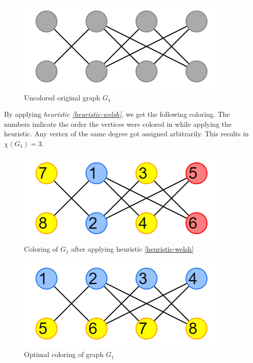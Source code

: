 \documentclass{article}
\newcounter{heuristic} \setcounter{heuristic}{0}
\theoremstyle{definition}
\begin{document}
\begin{figure}[H]
\centering
\includegraphics[scale=0.5]{images/graph-1.png}
\caption{Uncolored original graph \(G_1\)}
\end{figure}

By applying \emph{heuristic \ref{heuristic-welsh}}, we get the following coloring. The numbers indicate the order the vertices were colored in while applying the heuristic. Any vertex of the same degree got assigned arbitrarily. This results in \(\chi(G_1) = 3\).

\begin{multicols}{2}
  \begin{figure}[H]
  \centering
  \includegraphics[scale=0.5]{images/graph-2.png}
  \caption{Coloring of $G_1$ after applying heuristic \ref{heuristic-welsh}}
  \end{figure}

  \begin{figure}[H]
  \centering
  \includegraphics[scale=0.5]{images/graph-3.png}
  \caption{Optimal coloring of graph \(G_1\)}\label{fig:ex1-optimal}
  \end{figure}
\end{multicols}
\end{document}
